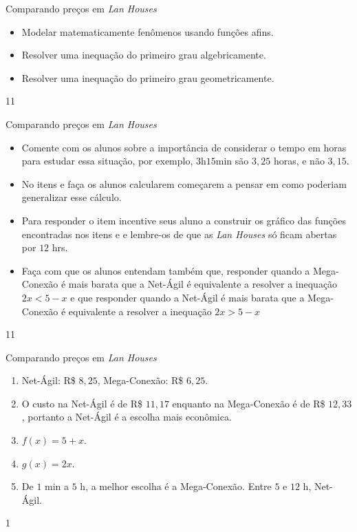 \clearpage
\def\currentcolor{session2}
\begin{objectives}{Comparando preços em \textit{Lan Houses}}
{
\begin{itemize}
\item Modelar matematicamente fenômenos usando funções afins. 
\item Resolver uma inequação do primeiro grau algebricamente.
\item Resolver uma inequação do primeiro grau geometricamente.
\end{itemize}
}{1}{1}
\end{objectives}
\begin{sugestions}{Comparando preços em \textit{Lan Houses}}
{
\begin{itemize}
\item Comente com os alunos sobre a importância de considerar o tempo em horas para estudar essa situação, por exemplo, $3$h$15$min são $3,25$ horas, e não $3,15$.
\item No itens  e  faça os alunos calcularem começarem a pensar em como poderiam generalizar esse cálculo.
\item Para responder o item  incentive seus aluno a construir os gráfico das funções encontradas nos itens  e  e lembre-os de que as \textit{Lan Houses} só ficam abertas por $12$ hrs. 
\item Faça com que os alunos entendam também que, responder quando a Mega-Conexão é mais barata que a Net-Ágil é equivalente a resolver a inequação $2x<5-x$ e que responder quando a Net-Ágil é mais barata que a Mega-Conexão é equivalente a resolver a inequação $2x>5-x$
\end{itemize}
}{1}{1}
\end{sugestions}
\begin{answer}{Comparando preços em \textit{Lan Houses}}
{
\begin{enumerate}
\item Net-Ágil: R\$ $8{,}25$, Mega-Conexão:  R\$ $6{,}25$.
\item  O custo na Net-Ágil é de  R\$ $11{,}17$ enquanto na Mega-Conexão é de R\$ $12{,}33$, portanto a Net-Ágil é a escolha mais econômica.
\item $f(x)=5+x$.
\item $g(x)=2x$.
\item De $1$ min a $5$ h, a melhor escolha é a Mega-Conexão. Entre $5$ e $12$ h, Net-Ágil.
\end{enumerate}
}{1}
\end{answer}
